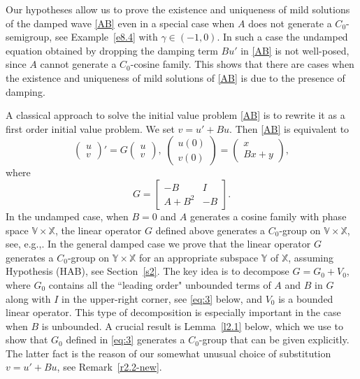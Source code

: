 \documentclass[11pt]{amsart}
\numberwithin{equation}{section}
\theoremstyle{remark}
\theoremstyle{definition}
\newcommand\bV{{\mathbb V}}
\newcommand\bX{{\mathbb X}}
\newcommand\bY{{\mathbb Y}}
\begin{document}
Our hypotheses allow us to prove the existence and uniqueness of mild solutions of the damped wave \eqref{AB} even in a special case when $A$ does not generate a $C_0$-semigroup, see Example~\ref{e8.4} with $\gamma\in(-1,0)$. In such a case the undamped equation obtained by dropping the damping term $Bu'$ in \eqref{AB} is not well-posed, since $A$ cannot generate a $C_0$-cosine family. This shows that there are cases when the existence and uniqueness of mild solutions of \eqref{AB} is due to the presence of damping. 

A classical approach to solve the initial value problem \eqref{AB} is to rewrite it as a first order initial value problem. We set $v=u'+Bu$. Then \eqref{AB} is equivalent to
\begin{equation}\label{ABG}
	\begin{pmatrix}u\\v\end{pmatrix}' = G\begin{pmatrix}u\\v\end{pmatrix},\;
	\begin{pmatrix}u(0)\\v(0)\end{pmatrix} = \begin{pmatrix}x\\Bx+y\end{pmatrix},
\end{equation}
where
\begin{equation}\label{eq:G}
	G = \begin{bmatrix} -B & I \\ A+B^2 & -B \end{bmatrix}.
\end{equation}  
In the undamped case, when $B=0$ and $A$ generates a cosine family with phase space $\bV\times\bX$, the linear operator $G$ defined above generates a $C_0$-group on $\bV\times\bX$, see, e.g.,\cite[Theorem 3.14.11]{ABHN}. In the general damped case we prove that the linear operator $G$ generates a $C_0$-group on $\bY\times\bX$ for an appropriate subspace $\bY$ of $\bX$, assuming Hypothesis  (HAB), see Section~\ref{s2}. The key idea is to decompose $G=G_0+V_0$, where $G_0$ contains all the ``leading order" unbounded terms of $A$ and $B$ in $G$ along with $I$ in the upper-right corner, see \eqref{eq:3} below, and $V_0$ is a bounded linear operator. This type of decomposition is especially important in the case when $B$ is unbounded. A crucial result is Lemma~\ref{l2.1} below, which we use to show that $G_0$ defined in \eqref{eq:3} generates a $C_0$-group that can be given explicitly. The latter fact is the reason of our somewhat unusual choice of substitution $v=u'+Bu$, see Remark~\ref{r2.2-new}.
\end{document}
